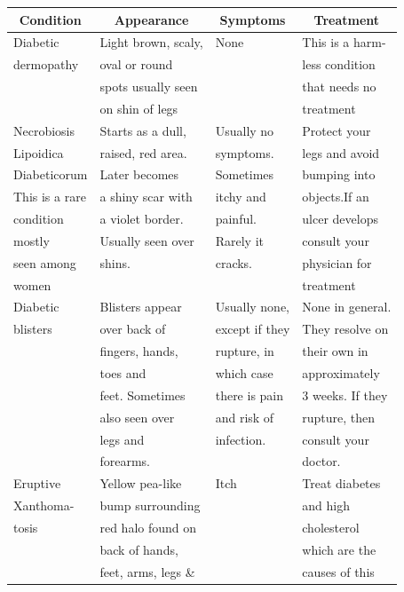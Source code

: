 {
\small\addtolength{\tabcolsep}{-.9pt}
\begin{longtable}{|l|l|l|l|}
\hline
\multicolumn{1}{|c|}{\textbf{{Condition}}} & \multicolumn{1}{|c|}{\textbf{Appearance}} & \multicolumn{1}{|c|}{\textbf{Symptoms}} & \multicolumn{1}{|c|}{\textbf{Treatment}}\\
\hline
Diabetic &  Light brown, scaly, & None & This is a harm-\\
dermopathy & oval or round &  & less condition\\
 & spots usually seen &  & that needs no\\
 & on shin of legs &  & treatment\\
\hline
Necrobiosis & Starts as a dull, & Usually no & Protect your\\
Lipoidica & raised, red area. & symptoms. & legs and avoid\\
Diabeticorum & Later becomes & Sometimes & bumping into\\
This is a rare & a shiny scar with & itchy and & objects.If an\\
condition & a violet border. & painful. & ulcer develops\\
mostly & Usually seen over & Rarely  it & consult your\\
seen among & shins. & cracks. & physician for\\
women &  &  & treatment\\
\hline
Diabetic & Blisters appear & Usually none, & None in general.\\
blisters & over back of & except if they & They resolve on\\
 & fingers, hands, & rupture, in & their own in\\
 & toes and & which case & approximately\\
 & feet. Sometimes & there is pain & 3 weeks. If they\\
 & also seen over & and risk of & rupture, then\\
 & legs and & infection. & consult your\\
 & forearms. &  & doctor.\\
\hline
Eruptive & Yellow pea-like & Itch & Treat diabetes\\
Xanthoma- & bump surrounding &  & and high\\
tosis  & red halo found on & & cholesterol\\
 & back of hands, &  & which are the\\
 & feet, arms, legs \& &  & causes of this\\

\end{longtable}}
